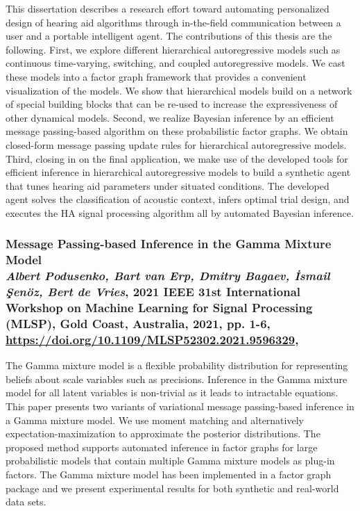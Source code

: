 This dissertation describes a research effort toward automating personalized design of hearing
aid algorithms through in-the-field communication between a user and a portable intelligent
agent.
The contributions of this thesis are the following.
First, we explore different hierarchical autoregressive models such as continuous
time-varying, switching, and coupled autoregressive models.
We cast these models into a factor graph framework that provides a convenient visualization of
the models.
We show that hierarchical models build on a network of special building blocks that can be
re-used to increase the expressiveness of other dynamical models.
Second, we realize Bayesian inference by an efficient message passing-based algorithm on these
probabilistic factor graphs.
We obtain closed-form message passing update rules for hierarchical autoregressive models.
Third, closing in on the final application, we make use of the developed tools for efficient
inference in hierarchical autoregressive models to build a synthetic agent that tunes hearing
aid parameters under situated conditions.
The developed agent solves the classification of acoustic context, infers optimal trial
design, and executes the HA signal processing algorithm all by automated Bayesian inference.

\subsubsection*{Message Passing-based Inference in the Gamma Mixture Model\\{\small \normalfont \textit{Albert Podusenko, Bart van Erp, Dmitry Bagaev, İsmail Şenöz, Bert de Vries}, 2021 IEEE 31st International Workshop on Machine Learning for Signal Processing (MLSP), Gold Coast, Australia, 2021, pp. 1-6, \url{https://doi.org/10.1109/MLSP52302.2021.9596329}, \citep{podusenko_message_2021}}}

The Gamma mixture model is a flexible probability distribution for representing beliefs about
scale variables such as precisions.
Inference in the Gamma mixture model for all latent variables is non-trivial as it leads to
intractable equations.
This paper presents two variants of variational message passing-based inference in a Gamma
mixture model.
We use moment matching and alternatively expectation-maximization to approximate the posterior
distributions.
The proposed method supports automated inference in factor graphs for large probabilistic
models that contain multiple Gamma mixture models as plug-in factors.
The Gamma mixture model has been implemented in a factor graph package and we present
experimental results for both synthetic and real-world data sets.

